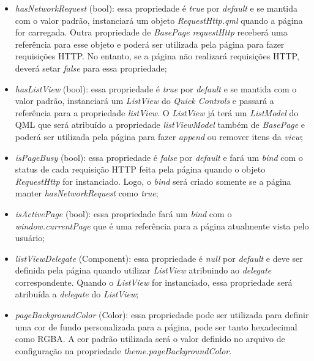 \begin{itemize}
	\item \textit{hasNetworkRequest} (bool): essa propriedade é \textit{true} por \textit{default} e se mantida com o valor padrão, instanciará um objeto \textit{RequestHttp.qml} quando a página for carregada. Outra propriedade de \textit{BasePage} \textit{requestHttp} receberá uma referência para esse objeto e poderá ser utilizada pela página para fazer requisições HTTP. No entanto, se a página não realizará requisições HTTP, deverá setar \textit{false} para essa propriedade;

	\item \textit{hasListView} (bool): essa propriedade é \textit{true} por \textit{default} e se mantida com o valor padrão, instanciará um \textit{ListView} do \textit{Quick Controls} e passará a referência para a propriedade \textit{listView}. O \textit{ListView} já terá um \textit{ListModel} do QML que será atribuído a propriedade \textit{listViewModel} também de \textit{BasePage} e poderá ser utilizada pela página para fazer \textit{append} ou remover itens da \textit{view};

	\item \textit{isPageBusy} (bool): essa propriedade é \textit{false} por \textit{default} e fará um \textit{bind} com o status de cada requisição HTTP feita pela página quando o objeto \textit{RequestHttp} for instanciado. Logo, o \textit{bind} será criado somente se a página manter \textit{hasNetworkRequest} como \textit{true};

	\item \textit{isActivePage} (bool): essa propriedade fará um \textit{bind} com o \textit{window.currentPage} que é uma referência para a página atualmente vista pelo usuário;

	\item \textit{listViewDelegate} (Component): essa propriedade é \textit{null} por \textit{default} e deve ser definida pela página quando utilizar \textit{ListView} atribuindo ao \textit{delegate} correspondente. Quando o \textit{ListView} for instanciado, essa propriedade será atribuída a \textit{delegate} do \textit{ListView};

	\item \textit{pageBackgroundColor} (Color): essa propriedade pode ser utilizada para definir uma cor de fundo personalizada para a página, pode ser tanto hexadecimal como RGBA. A cor padrão utilizada será o valor definido no arquivo de configuração na propriedade \textit{theme.pageBackgroundColor}.
\end{itemize}

